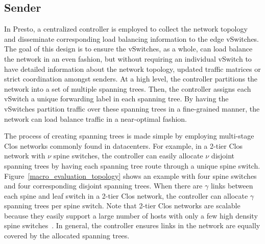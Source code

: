 \subsection{Sender}


In Presto, a centralized controller is employed to collect the
network topology and disseminate corresponding load balancing information to the edge vSwitches. 
The goal of this design is to ensure the vSwitches, as a whole, can load balance the network
in an even fashion, but without requiring an individual vSwitch to have detailed information
about the network topology, updated traffic matrices or strict coordination amongst senders.
 At a high level, the controller partitions
the network into a set of multiple spanning trees. Then, the controller
assigns each vSwitch a unique forwarding label in each spanning tree.
By having the vSwitches partition traffic over these spanning trees in a fine-grained
manner, the network can load balance traffic in a near-optimal fashion.

The process of creating spanning trees is made simple by employing multi-stage Clos
networks commonly found in datacenters. For example, in a 2-tier Clos network
with $\nu$ spine switches, the controller can easily allocate $\nu$ disjoint spanning
trees by having each spanning tree route through a unique spine switch. Figure~\ref{macro_evaluation_topology}
shows an example with four spine switches and four corresponding disjoint spanning trees.
When there are $\gamma$ links between each spine and leaf switch in a 2-tier Clos network,
the controller can allocate $\gamma$ spanning trees per spine switch.
Note that 2-tier Clos networks are scalable because they easily support a large number
of hosts with only a few high density spine switches~\cite{conga}.
In general, the controller ensures links in the network are equally covered
by the allocated spanning trees.

